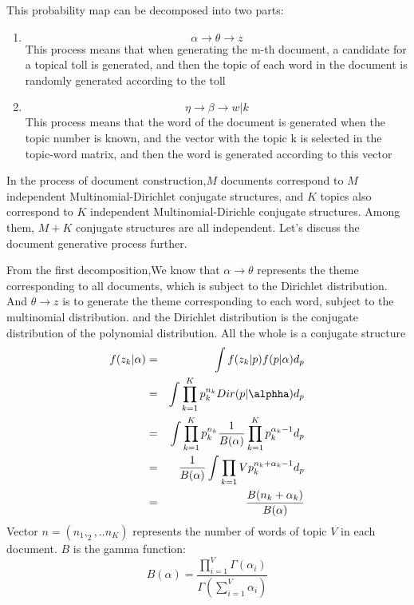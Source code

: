This probability map can be decomposed into two parts:
\begin{enumerate}
  \item $$\alpha \rightarrow \theta  \rightarrow z $$
This process means that when generating the m-th document, a candidate for a topical toll is generated, and then the topic of each word in the document is randomly generated according to the toll
  \item $$\eta \rightarrow \beta  \rightarrow w|k $$This process means that the word of the document is generated when the topic number is known, and the vector with the topic k is selected in the topic-word matrix, and then the word is generated according to this vector
\end{enumerate}

In the process of document construction,$ M$ documents correspond to $M$ independent Multinomial-Dirichlet conjugate structures, and $K$ topics also correspond to $K$ independent Multinomial-Dirichle conjugate structures. Among them, $M+K$ conjugate structures are all independent. Let’s discuss the document generative process further.


From the first decomposition,We know that $\alpha \rightarrow \theta$ represents the theme corresponding to all documents, which is subject to the Dirichlet distribution. And $\theta  \rightarrow z$  is to generate the theme corresponding to each word, subject to the multinomial distribution. and the Dirichlet distribution is the conjugate distribution of the polynomial distribution. All the whole is a conjugate structure
\begin{eqnarray*}
  f(z_k|\alpha) &=& \int f(z_k|p)f(p|\alpha) d_p \\
              &=& \int \prod_{k=1}^K p_k^{n_k} Dir(p|\alphha) d_p \\
              &=& \int \prod_{k=1}^K p_k^{n_k} \frac{1}{B(\alpha)}\prod_{k=1}^{K}p_k^{\alpha_k-1} d_p \\
              &=& \frac{1}{B(\alpha)}\int \prod_{k=1}{V}p_k^{n_k+\alpha_k-1} d_p \\
              &=& \frac{B(n_k+\alpha_k)}{B(\alpha)}
\end{eqnarray*}
Vector $n = (n_1,_2,..n_K)$ represents the number of words of topic $V$ in each document.
$B$ is the gamma function:
\[
  B(\alpha) = \frac{\prod_{i=1}^V\Gamma(\alpha_i)}{\Gamma(\sum_{i=1}^V \alpha_i)}
\]

